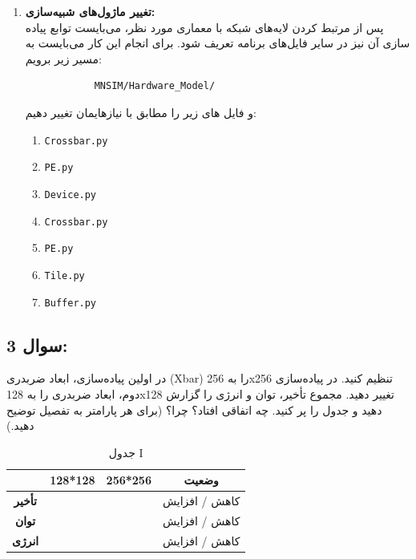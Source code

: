 \documentclass[12pt]{exam}
\begin{document}
\begin{questions}
\begin{enumerate}
	
	\item \textbf{تغییر ماژول‌های شبیه‌سازی:}\\
	
	پس از مرتبط کردن لایه‌های شبکه با معماری  مورد نظر، می‌بایست توابع پیاده سازی آن نیز در سایر فایل‌های برنامه تعریف شود. برای انجام این کار می‌بایست به مسیر زیر برویم:
	
	\begin{latin}
		\begin{verbatim}
			MNSIM/Hardware_Model/ 
		\end{verbatim} 
	\end{latin}
	
	و فایل های زیر را مطابق با نیاز‌هایمان تغییر دهیم:
	\begin{latin}
		\begin{enumerate}
			\item \texttt{Crossbar.py}
			\item \texttt{PE.py}
			\item \texttt{Device.py}
			\item \texttt{Crossbar.py}
			\item \texttt{PE.py}
			\item \texttt{Tile.py}
			\item \texttt{Buffer.py}
		\end{enumerate} 
	\end{latin}
\end{enumerate}
	
	
	
	
	
	
	
	
	
	
	
	
	
	
	
	
	
	
	
	
	
	
	
	
	
	
	
	\subsection*{سوال 3:}
	
	در اولین پیاده‌سازی، ابعاد ضربدری (Xbar) را به 256x256 تنظیم کنید. در پیاده‌سازی دوم، ابعاد ضربدری را به 128x128 تغییر دهید. مجموع تأخیر، توان و انرژی را گزارش دهید و جدول را پر کنید. چه اتفاقی افتاد؟ چرا؟ (برای هر پارامتر به تفصیل توضیح دهید.)
	
	\begin{table}[h]
		\centering
		\begin{tabular}{|c|c|c|c|}
			\hline
			& \textbf{128*128} & \textbf{256*256} & \textbf{وضعیت} \\ \hline
			\textbf{تأخیر} & & & کاهش / افزایش \\ \hline
			\textbf{توان} & & & کاهش / افزایش \\ \hline
			\textbf{انرژی} & & & کاهش / افزایش \\ \hline
		\end{tabular}
		\caption{جدول I}
	\end{table}
		
	
 \end{questions}
\end{document}
